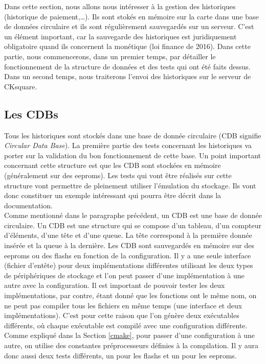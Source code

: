 \documentclass[a4paper]{article}
\begin{document}
Dans cette section, nous allons nous intéresser à la gestion des historiques
(historique de paiement,\dots). Ils sont stokés en mémoire sur la carte dans
une base de données circulaire et ils sont régulièrement sauvegardés sur un
serveur. C'est un élément important, car la sauvegarde des historiques est
juridiquement obligatoire quand ils concernent la monétique (loi finance de
2016). Dans cette partie, nous commencerons, dans un premier temps, par
détailler le fonctionnement de la structure de données et des tests qui ont
été faits dessus. Dans un second temps, nous traiterons l'envoi des
historiques sur le serveur de CKsquare.

\subsection{Les CDBs}
\label{cdbs}

Tous les historiques sont stockés dans une base de donnée circulaire (CDB
signifie \textit{Circular Data Base}). La première partie des tests concernant
les historiques va porter sur la validation du bon fonctionnement de cette base.
Un point important concernant cette structure est que les CDB sont stockées en
mémoire (généralement sur des eeproms). Les tests qui vont être réalisés sur
cette structure vont permettre de pleinement utiliser l'émulation du stockage.
Ils vont donc constituer un exemple intéressant qui pourra être décrit dans la
documentation.\\

Comme mentionné dans le paragraphe précédent, un CDB est une base de donnée
circulaire. Un CDB est une structure qui se compose d'un tableau, d'un compteur
d'éléments, d'une tête et d'une queue. La tête correspond à la première donnée
insérée et la queue à la dernière. Les CDB sont sauvegardés en mémoire sur des
eeproms ou des flashs en fonction de la configuration. Il y a une seule
interface (fichier d'entête) pour deux implémentations différentes utilisant les
deux types de périphériques de stockage et l'on peut passer d'une implémentation à
une autre avec la configuration. Il est important de pouvoir tester les deux
implémentations, par contre, étant donné que les fonctions ont le même nom, on
ne peut pas compiler tous les fichiers en même temps (une interface et deux
implémentations). C'est pour cette raison que l'on génère deux exécutables
différents, où chaque exécutable est compilé avec une configuration différente.
Comme expliqué dans la Section \ref{cmake}, pour passer d'une configuration à
une autre, on utilise des constantes préprocesseurs définies à la compilation.
Il y aura donc aussi deux tests différents, un pour les flashs et un pour les
eeproms.
\end{document}
